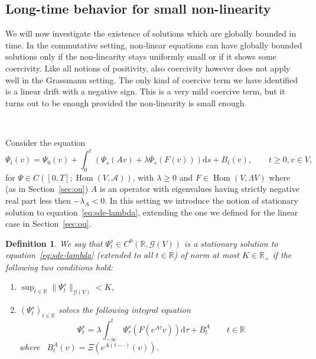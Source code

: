 \documentclass{article}
\newcommand{\mathd}{\mathrm{d}}
\newcommand{\tmop}[1]{\ensuremath{\operatorname{#1}}}
\newtheorem{definition}[theorem]{Definition}
\begin{document}
\subsection{Long-time behavior for small non-linearity}\label{sec:long-time}

We will now investigate the existence of solutions which are globally bounded
in time. In the commutative setting, non-linear equations can have globally
bounded solutions only if the non-linearity stays uniformly small or if it
shows some coercivity. Like all notions of positivity, also coercivity however
does not apply well in the Grassmann setting. The only kind of coercive term
we have identified is a linear drift with a negative sign. This is a very mild
coercive term, but it turns out to be enough provided the non-linearity is
small enough.

\

Consider the equation
\begin{equation}
  \Psi_t (v) = \Psi_0 (v) + \int_0^t (\Psi_s (A v) + \lambda \Psi_s (F (v)))
  \mathd s + B_t (v), \qquad t \geqslant 0, v \in V, \label{eq:sde-lambda}
\end{equation}
for $\Psi \in C ([0, T] ; \tmop{Hom} (V, \mathcal{A}))$, with $\lambda
\geqslant 0$ and $F \in \tmop{Hom} (V, \Lambda V)$ where (as in
Section~\ref{sec:ou}) $A$ is an operator with eigenvalues having strictly
negative real part less then $- \lambda_A < 0$. In this setting we introduce
the notion of stationary solution to equation~{\eqref{eq:sde-lambda}},
extending the one we defined for the linear case in Section~\ref{sec:ou}.

\begin{definition}
  We say that $\Psi^s_t \in C^0 (\mathbb{R}, \mathcal{G} (V))$ is a stationary
  solution to equation~{\eqref{eq:sde-lambda}} (extended to all $t \in
  \mathbb{R}$) of norm at most $K \in \mathbb{R}_+$ if the following two
  conditions hold:
  \begin{enumerate}
    \item $\sup_{t \in \mathbb{R}} \| \Psi^s_t \|_{\mathcal{G} (V)} < K$,
    
    \item $(\Psi^s_t)_{t \in \mathbb{R}}$ solves the following integral
    equation
    \begin{equation}
      \Psi^s_t = \lambda \int_{- \infty}^t \Psi^s_{\tau} (F (e^{A \tau} v))
      \mathd \tau + B^A_t \label{eq:stationary} \qquad t \in \mathbb{R}
    \end{equation}
    where \ $B^A_t (v) = \Xi (e^{A (t - \cdot)} (v))$.
  \end{enumerate}
\end{definition}
\end{document}
